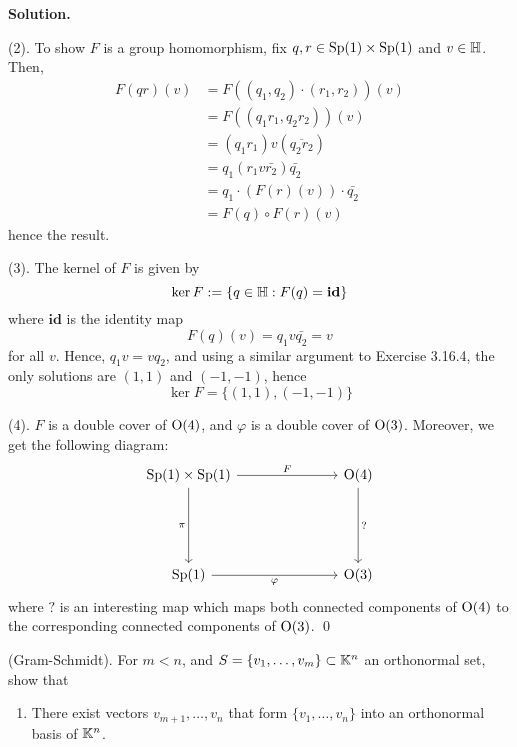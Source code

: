 \documentclass[12pt]{book}
\theoremstyle{definition}
\newenvironment{solution}
{%
  \par\noindent\textbf{Solution.}\quad
}
{%
  \qed\par
}
\begin{document}
\begin{solution}
  (2). To show $F$ is a group homomorphism, fix $q, r \in \mathrm{Sp}(1) \times \mathrm{Sp}(1)$ and $v \in \mathbb{H}$.
  Then, 
  \[
  \begin{aligned}
    F(qr)(v) &= F((q_1, q_2) \cdot (r_1, r_2))(v) \\
             &= F((q_1r_1, q_2r_2))(v) \\
             &= (q_1r_1)v(\overline{q_2r_2}) \\
             &= q_1(r_1v\bar{r_2})\bar{q_2} \\
             &= q_1 \cdot (F(r)(v)) \cdot\bar{q_2} \\
             &= F(q) \circ F(r) (v)
  \end{aligned}
  \]
  hence the result. 

  (3). The kernel of $F$ is given by
  \[
  \ker{F} := \{q \in \mathbb{H} : F(q) = \textbf{id}\}
  \]
  where $\textbf{id}$ is the identity map 
  \[
  F(q)(v) = q_1v\bar{q_2} = v
  \]
  for all $v$. 
  Hence, $q_1v = vq_2$, and using a similar argument to Exercise 3.16.4, the only solutions are $(1,1)$ and $(-1, -1)$, hence
  \[\ker{F} = \{(1,1), (-1,-1)\}\]

  (4). $F$ is a double cover of $\mathrm{O}(4)$, and $\varphi$ is a double cover of $\mathrm{O}(3)$.
  Moreover, we get the following diagram:
  \[\begin{tikzcd}
    {\Sp{1} \times \Sp{1}} &&& \Ogroup{4} \\
    \\
    \\
    {\Sp{1}} &&& {\Ogroup{3}}
    \arrow["{F}", from=1-1, to=1-4]
    \arrow["\pi"', from=1-1, to=4-1]
    \arrow["{\varphi}"', from=4-1, to=4-4]
    \arrow["?", from=1-4, to=4-4]
  \end{tikzcd}\]
  where $?$ is an interesting map which maps both connected components of $\mathrm{O}(4)$ to the corresponding connected components of $\mathrm{O}(3)$.
\end{solution}

\begin{taggedexercise}[\textcolor{yellow}{WIP}]
(Gram-Schmidt). For $m < n$, and $S = \{v_1, \dots , v_m\} \subset \mathbb{K}^n$ an orthonormal set, show that 
\begin{enumerate}
  \item There exist vectors $v_{m+1}, \dots , v_n$ that form $\{v_1 , \dots , v_n\}$ into an orthonormal basis of $\mathbb{K}^n$.
\end{enumerate}
\end{taggedexercise}
\end{document}
